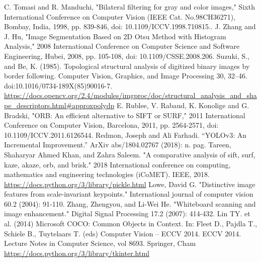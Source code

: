 \documentclass[conference]{IEEEtran}
\begin{document}
\begin{thebibliography}{00}
 C. Tomasi and R. Manduchi, "Bilateral filtering for gray and color images," Sixth International Conference on Computer Vision (IEEE Cat. No.98CH36271), Bombay, India, 1998, pp. 839-846, doi: 10.1109/ICCV.1998.710815..
 J. Zhang and J. Hu, "Image Segmentation Based on 2D Otsu Method with Histogram Analysis," 2008 International Conference on Computer Science and Software Engineering, Hubei, 2008, pp. 105-108, doi: 10.1109/CSSE.2008.206.
Suzuki, S., and Be, K. (1985). Topological structural analysis of digitized binary images by border following. Computer Vision, Graphics, and Image Processing 30, 32–46. doi:10.1016/0734-189X(85)90016-7.
 \url{https://docs.opencv.org/2.4/modules/imgproc/doc/structural_analysis_and_shape_descriptors.html#approxpolydp}
 E. Rublee, V. Rabaud, K. Konolige and G. Bradski, "ORB: An efficient alternative to SIFT or SURF," 2011 International Conference on Computer Vision, Barcelona, 2011, pp. 2564-2571, doi: 10.1109/ICCV.2011.6126544.
Redmon, Joseph and Ali Farhadi. “YOLOv3: An Incremental Improvement.” ArXiv abs/1804.02767 (2018): n. pag.
Tareen, Shaharyar Ahmed Khan, and Zahra Saleem. "A comparative analysis of sift, surf, kaze, akaze, orb, and brisk." 2018 International conference on computing, mathematics and engineering technologies (iCoMET). IEEE, 2018.
 \url{https://docs.python.org/3/library/pickle.html}
 Lowe, David G. "Distinctive image features from scale-invariant keypoints." International journal of computer vision 60.2 (2004): 91-110.
Zhang, Zhengyou, and Li-Wei He. "Whiteboard scanning and image enhancement." Digital Signal Processing 17.2 (2007): 414-432.
Lin TY. et al. (2014) Microsoft COCO: Common Objects in Context. In: Fleet D., Pajdla T., Schiele B., Tuytelaars T. (eds) Computer Vision – ECCV 2014. ECCV 2014. Lecture Notes in Computer Science, vol 8693. Springer, Cham
 \url{https://docs.python.org/3/library/tkinter.html}

\end{thebibliography}
\end{document}
